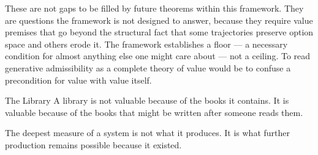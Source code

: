 \documentclass[12pt,twoside,openright]{book}
\begin{document}
These are not gaps to be filled by future theorems within
this framework. They are questions the framework is not
designed to answer, because they require value premises
that go beyond the structural fact that some trajectories
preserve option space and others erode it. The framework
establishes a floor --- a necessary condition for almost
anything else one might care about --- not a ceiling.
To read generative admissibility as a complete theory of
value would be to confuse a precondition for value with
value itself.

\begin{distinctionaside}{The Library}
A library is not valuable because of the books it contains.
It is valuable because of the books that might be written
after someone reads them.

The deepest measure of a system is not what it produces. It
is what further production remains possible because it
existed.
\end{distinctionaside}
\end{document}
